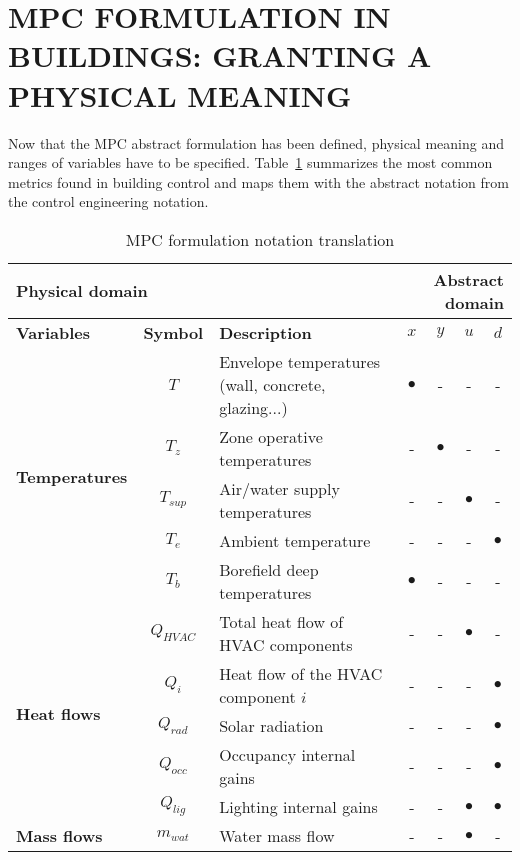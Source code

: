 \documentclass[10pt]{extarticle}
\begin{document}
\section{MPC FORMULATION IN BUILDINGS: GRANTING A PHYSICAL MEANING }

Now that the MPC abstract formulation has been defined, 
physical meaning and ranges of variables have to be specified.
Table~\ref{tab:mpc_form:translation} summarizes the most common
metrics found in building control and maps them with the abstract
notation from the control engineering notation. 


\begin{table}[h]
	\centering
	\caption{MPC formulation notation translation}
	\label{tab:mpc_form:translation}
	\begin{tabular}{l|c|l|cccc}
		\toprule
		\multicolumn{3}{l}{\textbf{Physical domain}} & \multicolumn{4}{r}{\textbf{Abstract domain}} \\
		\toprule
		\textbf{Variables} & \textbf{Symbol} & \textbf{Description} & \textbf{$x$} & \textbf{$y$} & \textbf{$u$} & \textbf{$d$} \\ 
		\midrule
		\multirow{5}{*}{\textbf{Temperatures}} & $T$ & Envelope temperatures (wall, concrete, glazing...) & $\bullet$ & - & - & - \\ 
		& $T_z$ & Zone operative temperatures & - & $\bullet$ & - & - \\
		& $T_{sup}$ & Air/water supply temperatures &  - & - & $\bullet$ & - \\
		& $T_e$ & Ambient temperature &  - & - & - & $\bullet$ \\
		& $T_b$ & Borefield deep temperatures & $\bullet$ & - & - & - \\
		\midrule
		\multirow{5}{*}{\textbf{Heat flows}} &
		$Q_{HVAC}$ & Total heat flow of HVAC components & - & - & $\bullet$ & - \\
		& $Q_{i}$ & Heat flow of the HVAC component $i$ & - & - & - & $\bullet$ \\
		& $Q_{rad}$ & Solar radiation & - & - & - & $\bullet$ \\
		& $Q_{occ}$ & Occupancy internal gains & - & - & - & $\bullet$ \\
		& $Q_{lig}$ & Lighting internal gains & - & - & $\bullet$ & $\bullet$ \\
		\midrule
		\multirow{2}{*}{\textbf{Mass flows}} &
		$m_{wat}$ & Water mass flow & - & - & $\bullet$ & - \\

\end{tabular}
\end{table}
\end{document}
